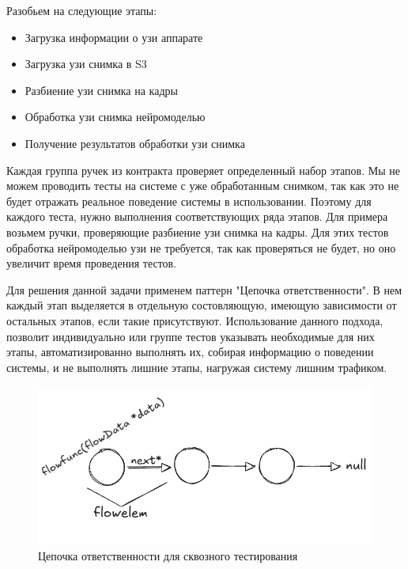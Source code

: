 Разобьем на следующие этапы:
\begin{itemize}
  \item Загрузка информации о узи аппарате
  \item Загрузка узи снимка в S3
  \item Разбиение узи снимка на кадры
  \item Обработка узи снимка нейромоделью
  \item Получение результатов обработки узи снимка
\end{itemize}

Каждая группа ручек из контракта проверяет определенный набор этапов. Мы не можем проводить тесты на системе с уже обработанным снимком,
так как это не будет отражать реальное поведение системы в использовании. Поэтому для каждого теста, нужно выполнения соответствующих ряда этапов.
Для примера возьмем ручки, проверяющие разбиение узи снимка на кадры. Для этих тестов обработка нейромоделью узи не требуется, так как проверяться не будет,
но оно увеличит время проведения тестов.

Для решения данной задачи применем паттерн "Цепочка ответственности". В нем каждый этап выделяется в отдельную состовляющую, имеющую зависимости от остальных этапов,
если такие присутствуют. Использование данного подхода, позволит индивидуально или группе тестов указывать необходимые для них этапы, автоматизированно выполнять их, 
собирая информацию о поведении системы, и не выполнять лишние этапы, нагружая систему лишним трафиком.
\begin{figure}[H]%
	\begin{center}
		\includegraphics[width=.7\columnwidth]{./img/new/flow_test.png}%
	\end{center}
	\caption{Цепочка ответственности для сквозного тестирования}%
	\label{pic:flow_test}%
\end{figure}

